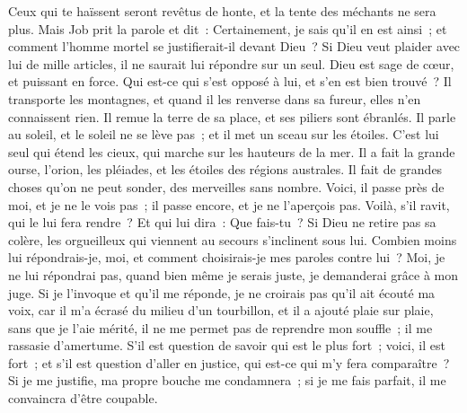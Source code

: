 \begin{multicols}{2}
Ceux qui te haïssent seront revêtus de honte, et la tente des méchants ne sera plus.
\VerseOne{}Mais Job prit la parole et dit~:
Certainement, je sais qu'il en est ainsi~; et comment l'homme mortel se justifierait-il devant Dieu~?
Si Dieu veut plaider avec lui de mille articles, il ne saurait lui répondre sur un seul.
 Dieu est sage de cœur, et puissant en force. Qui est-ce qui s'est opposé à lui, et s'en est bien trouvé~?
Il transporte les montagnes, et quand il les renverse dans sa fureur, elles n'en connaissent rien.
Il remue la terre de sa place, et ses piliers sont ébranlés.
Il parle au soleil, et le soleil ne se lève pas~; et il met un sceau sur les étoiles.
 C'est lui seul qui étend les cieux, qui marche sur les hauteurs de la mer.
Il a fait la grande ourse, l'orion, les pléiades, et les étoiles des régions australes.
Il fait de grandes choses qu'on ne peut sonder, des merveilles sans nombre.
Voici, il passe près de moi, et je ne le vois pas~; il passe encore, et je ne l'aperçois pas.
Voilà, s'il ravit, qui le lui fera rendre~? Et qui lui dira~: Que fais-tu~?
Si Dieu ne retire pas sa colère, les orgueilleux qui viennent au secours s'inclinent sous lui.
Combien moins lui répondrais-je, moi, et comment choisirais-je mes paroles contre lui~?
Moi, je ne lui répondrai pas, quand bien même je serais juste, je demanderai grâce à mon juge.
Si je l'invoque et qu'il me réponde, je ne croirais pas qu'il ait écouté ma voix,
car il m'a écrasé du milieu d'un tourbillon, et il a ajouté plaie sur plaie, sans que je l'aie mérité,
il ne me permet pas de reprendre mon souffle~; il me rassasie d'amertume.
S'il est question de savoir qui est le plus fort~; voici, il est fort~; et s'il est question d'aller en justice, qui est-ce qui m'y fera comparaître~?
Si je me justifie, ma propre bouche me condamnera~; si je me fais parfait, il me convaincra d'être coupable.

\end{multicols}
